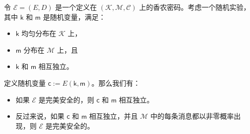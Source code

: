 \begin{theorem}\label{theo:2-4}
令 $\mathcal{E}=(E,D)$ 是一个定义在 $(\mathcal{K},\mathcal{M},\mathcal{C})$ 上的香农密码。考虑一个随机实验，其中 $\mathsf{k}$ 和 $\mathsf{m}$ 是随机变量，满足：
\begin{itemize}
	\item $\mathsf{k}$ 均匀分布在 $\mathcal{K}$ 上，
	\item $\mathsf{m}$ 分布在 $\mathcal{M}$ 上，且
	\item $\mathsf{k}$ 和 $\mathsf{m}$ 相互独立。
\end{itemize}
定义随机变量 $\mathsf{c}:=E(\mathsf{k},\mathsf{m})$。那么我们有：
\begin{itemize}
	\item 如果 $\mathcal{E}$ 是完美安全的，则 $\mathsf{c}$ 和 $\mathsf{m}$ 相互独立。
	\item 反过来说，如果 $\mathsf{c}$ 和 $\mathsf{m}$ 相互独立，并且 $\mathcal{M}$ 中的每条消息都以非零概率出现，则 $\mathcal{E}$ 是完美安全的。
\end{itemize}
\end{theorem}

